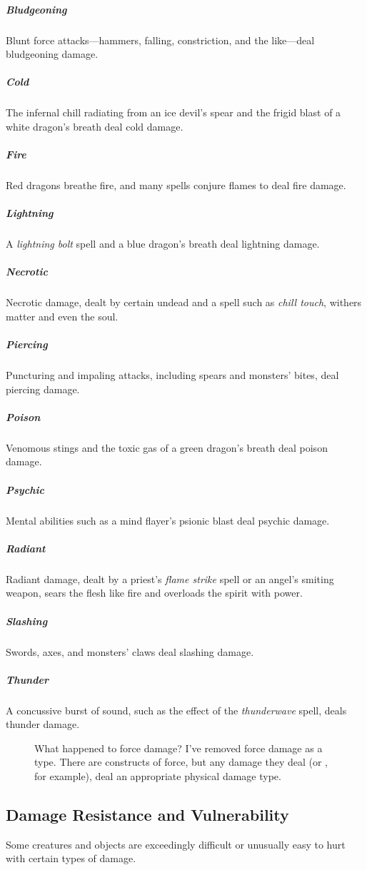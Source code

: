 \subparagraph*{Bludgeoning} Blunt force attacks—hammers, falling, constriction, and the like—deal bludgeoning damage.

\subparagraph*{Cold} The infernal chill radiating from an ice devil's spear and the frigid blast of a white dragon's breath deal cold damage.

\subparagraph*{Fire} Red dragons breathe fire, and many spells conjure flames to deal fire damage.

\subparagraph*{Lightning} A \textit{lightning bolt} spell and a blue dragon's breath deal lightning damage.

\subparagraph*{Necrotic} Necrotic damage, dealt by certain undead and a spell such as \textit{chill touch}, withers matter and even the soul.

\subparagraph*{Piercing} Puncturing and impaling attacks, including spears and monsters' bites, deal piercing damage.

\subparagraph*{Poison} Venomous stings and the toxic gas of a green dragon's breath deal poison damage.

\subparagraph*{Psychic} Mental abilities such as a mind flayer's psionic blast deal psychic damage.

\subparagraph*{Radiant} Radiant damage, dealt by a priest's \textit{flame strike} spell or an angel's smiting weapon, sears the flesh like fire and overloads the spirit with power.

\subparagraph*{Slashing} Swords, axes, and monsters' claws deal slashing damage.

\subparagraph*{Thunder} A concussive burst of sound, such as the effect of the \textit{thunderwave} spell, deals thunder damage.

\begin{figure}
    \begin{DndComment}{What happened to force damage?}
        I've removed force damage as a type. There are constructs of force, but any damage they deal (or , for example), deal an appropriate physical damage type.
    \end{DndComment}
\end{figure}

\subsection{Damage Resistance and Vulnerability}

Some creatures and objects are exceedingly difficult or unusually easy to hurt with certain types of damage.

